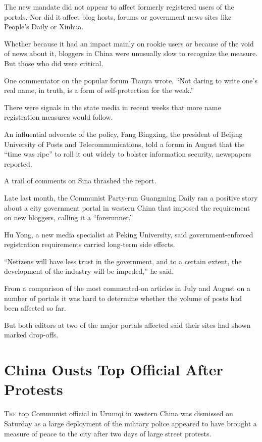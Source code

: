 ﻿\documentclass[12pt]{article}
\begin{document}
The new mandate did not appear to affect formerly registered users of the portals. Nor did it affect
blog hosts, forums or government news sites like People's Daily or Xinhua.

Whether because it had an impact mainly on rookie users or because of the void of news about it,
bloggers in China were unusually slow to recognize the measure. But those who did were critical.

One commentator on the popular forum Tianya wrote, ``Not daring to write one's real name, in truth,
is a form of self-protection for the weak.''

There were signals in the state media in recent weeks that more name registration measures would
follow.

An influential advocate of the policy, Fang Bingxing, the president of Beijing University of Posts
and Telecommunications, told a forum in August that the ``time was ripe'' to roll it out widely to
bolster information security, newspapers reported.

A trail of comments on Sina thrashed the report.

Late last month, the Communist Party-run Guangming Daily ran a positive story about a city
government portal in western China that imposed the requirement on new bloggers, calling it a
``forerunner.''

Hu Yong, a new media specialist at Peking University, said government-enforced registration
requirements carried long-term side effects.

``Netizens will have less trust in the government, and to a certain extent, the development of the
industry will be impeded,'' he said.

From a comparison of the most commented-on articles in July and August on a number of portals it was
hard to determine whether the volume of posts had been affected so far.

But both editors at two of the major portals affected said their sites had shown marked drop-offs.

\section{China Ousts\cite{oust} Top Official After Protests}

\lettrine{T}{he} top Communist official in Urumqi in western China was dismissed on Saturday as a
large deployment of the military police appeared to have brought a measure of peace to the city
after two days of large street protests.
\end{document}
